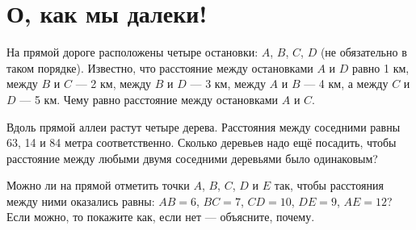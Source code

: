 \section{О, как мы далеки!}
\begin{itemize}

\itA На прямой дороге расположены четыре остановки: $A$, $B$, $C$, $D$ (не обязательно в таком порядке). Известно, что расстояние между остановками $A$ и $D$ равно 1 км, между $B$ и $C$ — 2 км, между $B$ и $D$ — 3 км, между $A$ и $B$ — 4 км, а между $C$ и $D$ — 5 км. Чему равно расстояние между остановками $A$ и $C$.

\itB Вдоль прямой аллеи растут четыре дерева. Расстояния между соседними равны 63, 14 и 84 метра соответственно. Сколько деревьев надо ещё посадить, чтобы расстояние между любыми двумя соседними деревьями было одинаковым?

\itC Можно ли на прямой отметить точки $A$, $B$, $C$, $D$ и $E$ так, чтобы расстояния между ними оказались равны: $AB=6$, $BC=7$, $CD=10$, $DE=9$, $AE=12$? Если можно, то покажите как, если нет — объясните, почему.
\end{itemize}